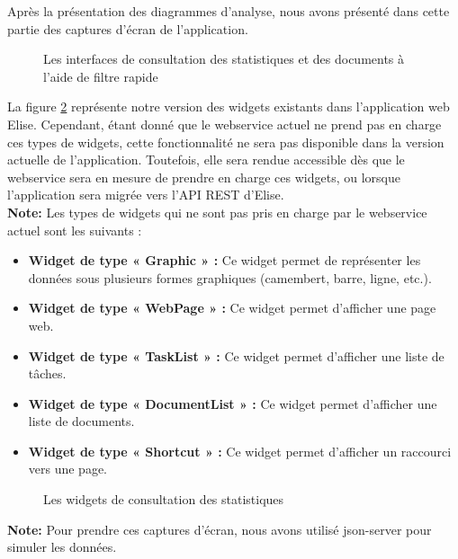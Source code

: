 Après la présentation des diagrammes d'analyse, nous avons présenté dans cette partie des captures d'écran de l'application.

\begin{figure}[H]
  \centering
  \caption{Les interfaces de consultation des statistiques et des documents à l'aide de filtre rapide}
  \label{fig:realisation_sprint7}
\end{figure}

La figure \ref{fig:capture_widgets} représente notre version des widgets existants dans l'application web Elise. Cependant, étant donné que le webservice actuel ne prend pas en charge ces types de widgets, cette fonctionnalité ne sera pas disponible dans la version actuelle de l'application. Toutefois, elle sera rendue accessible dès que le webservice sera en mesure de prendre en charge ces widgets, ou lorsque l'application sera migrée vers l'API REST d'Elise.\\

\textbf{Note:} Les types de widgets qui ne sont pas pris en charge par le webservice actuel sont les suivants :
\begin{itemize}
  \item \textbf{Widget de type « Graphic » :} Ce widget permet de représenter les données sous plusieurs formes graphiques (camembert, barre, ligne, etc.).
  \item \textbf{Widget de type « WebPage » :} Ce widget permet d'afficher une page web.
  \item \textbf{Widget de type « TaskList » :} Ce widget permet d'afficher une liste de tâches.
  \item \textbf{Widget de type « DocumentList » :} Ce widget permet d'afficher une liste de documents.
  \item \textbf{Widget de type « Shortcut » :} Ce widget permet d'afficher un raccourci vers une page.
  \end{itemize}

\begin{figure}[H]
  \centering
  \caption{Les widgets de consultation des statistiques}
  \label{fig:capture_widgets}
\end{figure}

\textbf{Note:} Pour prendre ces captures d'écran, nous avons utilisé json-server pour simuler les données.\\
  



